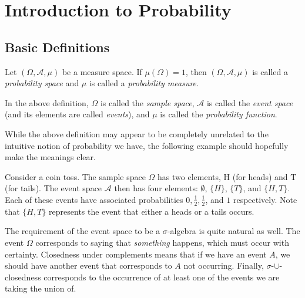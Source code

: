 \section{Introduction to Probability}

\subsection{Basic Definitions}

\begin{definition}
    Let $(\Omega,\mathcal{A},\mu)$ be a measure space. If $\mu(\Omega)=1$, then $(\Omega,\mathcal{A},\mu)$ is called a \textit{probability space} and $\mu$ is called a \textit{probability measure}.
\end{definition}

In the above definition, $\Omega$ is called the \textit{sample space}, $\mathcal{A}$ is called the \textit{event space} (and its elements are called \textit{events}), and $\mu$ is called the \textit{probability function}.

\vspace{1mm}
While the above definition may appear to be completely unrelated to the intuitive notion of probability we have, the following example should hopefully make the meanings clear. 

\vspace{1mm}
Consider a coin toss. The sample space $\Omega$ has two elements, $\text{H}$ (for heads) and $\text{T}$ (for tails). The event space $\mathcal{A}$ then has four elements: $\emptyset$, $\{H\}$, $\{T\}$, and $\{H,T\}$. Each of these events have associated probabilities $0,\frac{1}{2},\frac{1}{2}$, and $1$ respectively. Note that $\{H,T\}$ represents the event that either a heads or a tails occurs.

\vspace{2mm}
The requirement of the event space to be a $\sigma$-algebra is quite natural as well.
The event $\Omega$ corresponds to saying that \textit{something} happens, which must occur with certainty.
Closedness under complements means that if we have an event $A$, we should have another event that corresponds to $A$ not occurring.
Finally, $\sigma$-$\cup$-closedness corresponds to the occurrence of at least one of the events we are taking the union of.

